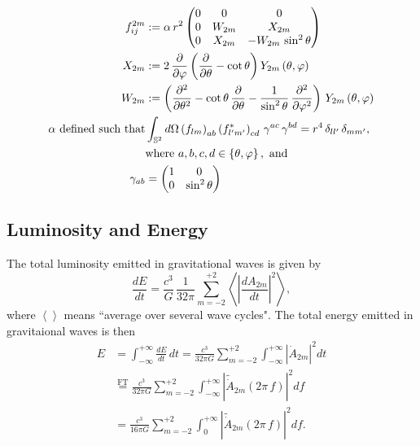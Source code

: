 \documentclass[aspectratio=169]{beamer}
\begin{document}
\begin{frame}

  \begin{align*}
    f^{2m}_{ij}&:=\alpha\,r^{2}
    \begin{pmatrix}
    0&0&0\\
    0&W_{2m}&X_{2m}\\
    0&X_{2m}&-W_{2m}\,\sin^{2}\theta
    \end{pmatrix}\\
    X_{2m}&:=2\,\frac{\partial}{\partial\varphi}\left(\frac{\partial}{\partial\theta}-\cot\theta\right)
    Y_{2m}\left(\theta,\varphi\right)\\
    W_{2m}&:=\left(\frac{\partial^{2}}{\partial\theta^{2}}
    -\cot\theta\,\frac{\partial}{\partial\theta}
    -\frac{1}{\sin^{2}\theta}\,\frac{\partial^{2}}{\partial\varphi^{2}}\right)\,
    Y_{2m}\left(\theta,\varphi\right)\\
    \alpha\textrm{ defined such that}&
    \int_{\mathbb{S}^{2}}d\Omega
    \left(f_{lm}\right)_{ab}\left(f^{*}_{l'm'}\right)_{cd}\,
    \gamma^{ac}\,\gamma^{bd}=r^{4}\,\delta_{ll'}\,\delta_{mm'},\\
    &\textrm{where }a,b,c,d\in\left\{\theta,\varphi\right\},\textrm{ and}\\
    \gamma_{ab}&=\begin{pmatrix}1&0\\0&\sin^{2}\theta\end{pmatrix}
  \end{align*}

\end{frame}

\subsection{Luminosity and Energy}

\begin{frame}

  The total luminosity emitted in gravitational waves is given by
  \begin{equation*}
    \frac{dE}{dt}=\frac{c^{3}}{G}\,\frac{1}{32\pi}
    \sum\limits_{m=-2}^{+2}\left<\left|\frac{dA_{2m}}{dt}\right|^{2}\right>,
  \end{equation*}
  where $\left<\right>$ means ``average over several wave cycles".
  The total energy emitted in gravitaional waves is then
  \begin{align*}
    E&=\int_{-\infty}^{+\infty}\frac{dE}{dt}\,dt
    =\frac{c^{3}}{32\pi G}\sum\limits_{m=-2}^{+2}
    \int_{-\infty}^{+\infty}\left|\dot{A}_{2m}\right|^{2}dt\\
    &\stackrel{\mathrm{FT}}{=}
    \frac{c^{3}}{32\pi G}\sum\limits_{m=-2}^{+2}\int_{-\infty}^{+\infty}
    \left|\tilde{\dot{A}}_{2m}\left(2\pi\,f\right)\right|^{2}df\\
    &=\frac{c^{3}}{16\pi G}\sum\limits_{m=-2}^{+2}\int_{0}^{+\infty}
    \left|\tilde{\dot{A}}_{2m}\left(2\pi\,f\right)\right|^{2}df.
  \end{align*}

\end{frame}
\end{document}
